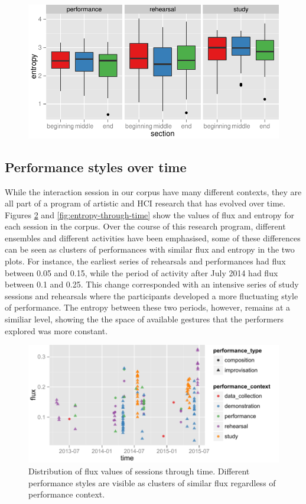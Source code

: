\documentclass{sigchi}
\begin{document}
\begin{figure}
  \centering
  \includegraphics[width=\linewidth]{figures/section-entropy}
  \caption{
    \label{fig:section-entropy}}
\end{figure}


\subsection{Performance styles over time}

While the interaction session in our corpus have many different
contexts, they are all part of a program of artistic and HCI research
that has evolved over time. Figures \ref{fig:flux-through-time} and
\ref{fig:entropy-through-time} show the values of flux and entropy for
each session in the corpus. Over the course of this research program,
different ensembles and different activities have been emphasised,
some of these differences can be seen as clusters of performances with
similar flux and entropy in the two plots. For instance, the earliest
series of rehearsals and performances had flux between 0.05 and 0.15,
while the period of activity after July 2014 had flux between 0.1 and
0.25. This change corresponded with an intensive series of study
sessions and rehearsals where the participants developed a more
fluctuating style of performance. The entropy between these two
periods, however, remains at a similiar level, showing the the space
of available gestures that the performers explored was more constant.

\begin{figure}
  \centering
  \includegraphics[width=\linewidth]{figures/flux-through-time}
  \caption{Distribution of flux values of sessions through time.
    Different performance styles are visible as clusters of similar
    flux regardless of performance context.
    \label{fig:flux-through-time}}
\end{figure}
\end{document}
